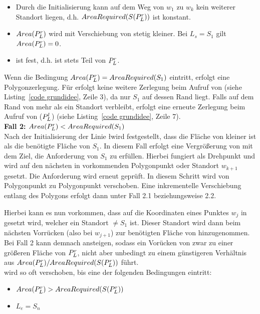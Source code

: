 \documentclass[ngerman]{seminarbeitrag}
\begin{document}
\begin{itemize}
\item Durch die Initialisierung kann auf dem Weg von $w_{1}$ zu $w_{k}$ kein weiterer Standort liegen, d.h. $AreaRequired(S(P_{L}^{r}))$ ist konstant.
\item $Area(P_{L}^{r})$ wird mit Verschiebung von \ls stetig kleiner. Bei $L_{s}=S_{1}$ gilt $Area(P_{L}^{r})=0$.
\item \Le ist fest, d.h. ist stets Teil von $P_{L}^{r}$.
\end{itemize}

Wenn die Bedingung $Area(P_{L}^{r})=AreaRequired(S_{1})$ eintritt, erfolgt eine Polygonzerlegung. Für \prl erfolgt keine weitere Zerlegung beim Aufruf von
\con (siehe Listing~\ref{code grundidee}, Zeile 3), da nur $S_{1}$ auf dessen Rand liegt. Falls auf dem Rand von \pll mehr als ein Standort verbleibt, erfolgt eine erneute
Zerlegung beim Aufruf von \con($P_{L}^{l}$) (siehe Listing~\ref{code grundidee}, Zeile 7).\\

\textbf{Fall 2: $Area(P_{L}^{r})<AreaRequired(S_{1})$} \\
Nach der Initialisierung der Linie \l wird festgestellt, dass die Fläche von \prl kleiner ist als die benötigte Fläche von $S_{1}$. In diesem Fall erfolgt eine Vergrößerung von \ar{\mprl}mit dem Ziel, die Anforderung von $S_{1}$ zu erfüllen. Hierbei fungiert \ls als Drehpunkt und \Le wird auf den nächsten in \w vorkommenden Polygonpunkt oder Standort $w_{k+1}$ gesetzt. Die Anforderung wird erneut geprüft. In diesem Schritt wird \Le von Polygonpunkt zu Polygonpunkt verschoben. Eine inkrementelle Verschiebung entlang des Polygons erfolgt dann unter Fall 2.1 beziehungsweise 2.2.

Hierbei kann es nun vorkommen, dass \Le auf die Koordinaten eines Punktes $w_{j}$ in \w gesetzt wird, welcher ein Standort $\ne S_{1}$ ist. Dieser Standort wird dann beim nächsten Vorrücken (also bei $w_{j+1}$) zur benötigten Fläche von \prl hinzugenommen. Bei Fall 2 kann \arreq{\mprl} demnach ansteigen, sodass ein Vorücken von \Le zwar zu einer größeren Fläche von $P_{L}^{r}$, nicht aber unbedingt zu einem günstigeren Verhältnis aus $Area(P_{L}^{r}) / AreaRequired(S(P_{L}^{r}))$ führt. \\
\Le wird so oft verschoben, bis eine der folgenden Bedingungen eintritt:\\

\begin{itemize}
\item $Area(P_{L}^{r})>AreaRequired(S(P_{L}^{r}))$
\item $L_{e} = S_{n}$
\end{itemize}
\end{document}
